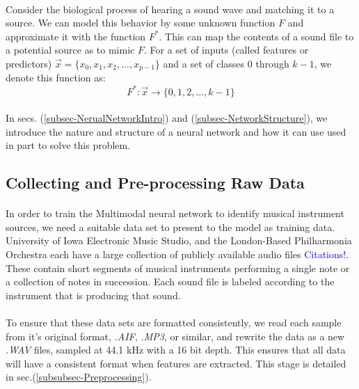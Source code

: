 \documentclass[12pt,letterpaper]{article}
\begin{document}
\paragraph*{}Consider the biological process of hearing a sound wave and matching it to a source. We can model this behavior by some unknown function $F$ and approximate it with the function $F^*$. This can map the contents of a sound file to a potential source as to mimic $F$. For a set of inputs (called features or predictors) $\vec{x} = \big\{ x_0 , x_1 , x_2 , ... , x_{p-1} \big\}$ and a set of classes $0$ through $k-1$, we denote this function as:
\begin{equation}
\label{eqn-MappingFunction}
F^*: \vec{x} \rightarrow \big\{ 0 , 1 , 2 , ... , k-1 \big\}
\end{equation}

\paragraph*{}In secs. (\ref{subsec-NerualNetworkIntro}) and (\ref{subsec-NetworkStructure}), we introduce the nature and structure of a neural network and how it can use used in part to solve this problem.


\subsection{Collecting and Pre-processing Raw Data}

\paragraph*{}In order to train the Multimodal neural network to identify musical instrument sources, we need a suitable data set to present to the model as training data. University of Iowa Electronic Music Studio, and the London-Based Philharmonia Orchestra each have a large collection of publicly available audio files \textcolor{blue}{Citations!}. These contain short segments of musical instruments performing a single note or a collection of notes in succession. Each sound file is labeled according to the instrument that is producing that sound.

\paragraph*{}To ensure that these data sets are formatted consistently, we read each sample from it's original format, \textit{.AIF}, \textit{.MP3}, or similar, and rewrite the data as a new \textit{.WAV} files, sampled at 44.1 kHz with a 16 bit depth. This ensures that all data will have a consistent format when features are extracted. This stage is detailed in sec.(\ref{subsubsec-Preprocessing}).
\end{document}
